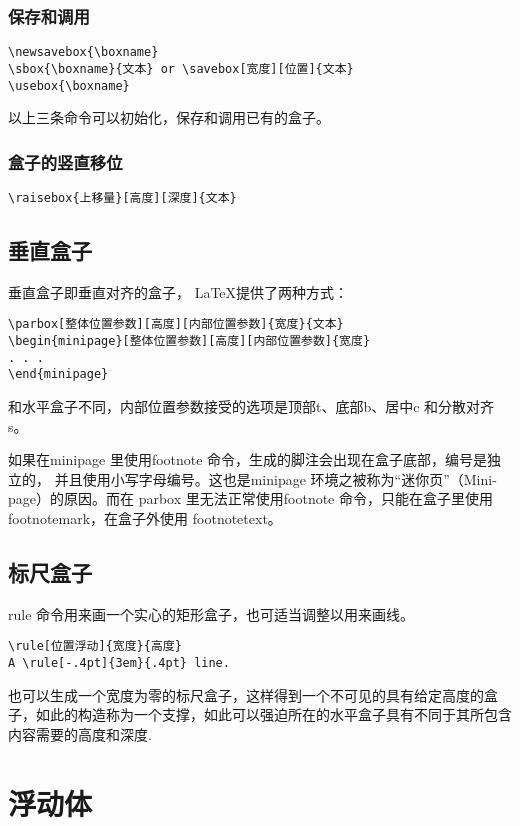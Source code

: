 \documentclass[11pt]{article}%
\begin{document}
\subsubsection{保存和调用}
\begin{verbatim}
\newsavebox{\boxname}
\sbox{\boxname}{文本} or \savebox[宽度][位置]{文本}
\usebox{\boxname}
\end{verbatim}
以上三条命令可以初始化，保存和调用已有的盒子。

\subsubsection{盒子的竖直移位}
\begin{verbatim}
\raisebox{上移量}[高度][深度]{文本}
\end{verbatim}

\subsection{垂直盒子}
垂直盒子即垂直对齐的盒子， \LaTeX 提供了两种方式：
\begin{verbatim}
\parbox[整体位置参数][高度][内部位置参数]{宽度}{文本}
\begin{minipage}[整体位置参数][高度][内部位置参数]{宽度}
. . .
\end{minipage}
\end{verbatim}
和水平盒子不同，内部位置参数接受的选项是顶部t、底部b、居中c 和分散对齐s。

如果在minipage 里使用footnote 命令，生成的脚注会出现在盒子底部，编号是独立的，
并且使用小写字母编号。这也是minipage 环境之被称为“迷你页”（Mini-page）的原因。而在
parbox 里无法正常使用footnote 命令，只能在盒子里使用footnotemark，在盒子外使用
footnotetext。
\subsection{标尺盒子}
rule 命令用来画一个实心的矩形盒子，也可适当调整以用来画线。
\begin{verbatim}
\rule[位置浮动]{宽度}{高度}
A \rule[-.4pt]{3em}{.4pt} line.
\end{verbatim}
也可以生成一个宽度为零的标尺盒子，这样得到一个不可见的具有给定高度的盒子，如此的构造称为一个支撑，如此可以强迫所在的水平盒子具有不同于其所包含内容需要的高度和深度.
\section{浮动体}
\end{document}
